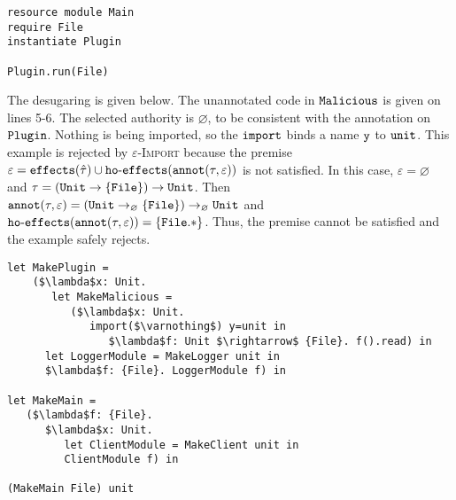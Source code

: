 \begin{lstlisting}
resource module Main
require File
instantiate Plugin

Plugin.run(File)
\end{lstlisting}

The desugaring is given below. The unannotated code in $\mathtt{Malicious}$ is given on lines 5-6. The selected authority is $\varnothing$, to be consistent with the annotation on $\mathtt{Plugin}$. Nothing is being imported, so the $\mathtt{import}$ binds a name $\mathtt{y}$ to $\mathtt{unit}$. This example is rejected by \textsc{$\varepsilon$-Import} because the premise $\varepsilon = \mathtt{effects}(\hat \tau) \cup \mathtt{ho \hbox{-} effects}(\mathtt{annot}(\tau, \varepsilon))$ is not satisfied. In this case, $\varepsilon = \varnothing$ and $\tau = \mathtt{ (Unit \rightarrow \{ File \}) \rightarrow Unit }$. Then $\mathtt{annot}(\tau, \varepsilon) = \mathtt{ (Unit \rightarrow_{\varnothing} \{ File \}) \rightarrow_{\varnothing} Unit }$ and $\mathtt{ho \hbox{-} effects}(\mathtt{annot}(\tau, \varepsilon)) = \{ \mathtt{File.*} \}$. Thus, the premise cannot be satisfied and the example safely rejects.


\begin{lstlisting}
let MakePlugin =
	($\lambda$x: Unit.
	   let MakeMalicious =
	      ($\lambda$x: Unit.
	         import($\varnothing$) y=unit in
	            $\lambda$f: Unit $\rightarrow$ {File}. f().read) in
      let LoggerModule = MakeLogger unit in
      $\lambda$f: {File}. LoggerModule f) in

let MakeMain =
   ($\lambda$f: {File}.
      $\lambda$x: Unit.
         let ClientModule = MakeClient unit in
         ClientModule f) in

(MakeMain File) unit
\end{lstlisting}






